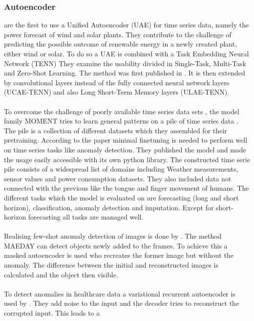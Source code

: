 \subsubsection{Autoencoder}
 are the first to use a Unified Autoencoder (UAE) for time series data, namely the power forecast of wind and solar plants. They contribute to the challenge of predicting the possible outcome of renewable energy in a newly created plant, either wind or solar. To do so a UAE is combined with a Task Embedding Neural Network (TENN) They examine the usability divided in Single-Task, Multi-Task and Zero-Shot Learning. The method was first published in . It is then extended by convolutional layers instead of the fully connected neural network layers (UCAE-TENN)
and also Long Short-Term Memory layers (ULAE-TENN).\\\\
To overcome the challenge of poorly available time series data sets \cite{ma_survey_2023}, the model family MOMENT tries to learn general patterns on a pile of time series data \cite{goswami_moment_2024}. The pile is a collection of different datasets which they assembled for their pretraining. According to the paper minimal finetuning is needed to perform well on time series tasks like anomaly detection. They published the model and made the usage easily accessible with its own python library. The constructed time serie pile consists of a widespread list of domains including Weather measurements, sensor values and power consumption datasets. They also included data not connected with the previous like the tongue and finger movement of humans. The different tasks which the model is evaluated on are forecasting (long and short horizon), classification, anomaly detection and imputation. Except for short-horizon forecasting all tasks are managed well. \\\\
Realising few-shot anomaly detection of images is done by . The method MAEDAY can detect objects newly added to the frames. To achieve this a masked autoencoder is used who recreates the former image but without the anomaly. The difference between the initial and reconstructed images is calculated and the object then visible.\\\\
To detect anomalies in healthcare data a variational recurrent autoencoder is used by . They add noise to the input and the decoder tries to reconstruct the corrupted input. This leads to a \\\\%
